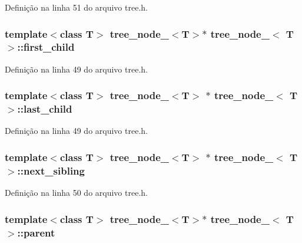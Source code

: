 Definição na linha 51 do arquivo tree.\+h.

\subsubsection[{first\+\_\+child}]{\setlength{\rightskip}{0pt plus 5cm}template$<$class T$>$ {\bf tree\+\_\+node\+\_\+}$<$T$>$$\ast$ {\bf tree\+\_\+node\+\_\+}$<$ T $>$\+::first\+\_\+child}\label{classtree__node___ad51591496e654515b662095f70d1fc1a}


Definição na linha 49 do arquivo tree.\+h.

\subsubsection[{last\+\_\+child}]{\setlength{\rightskip}{0pt plus 5cm}template$<$class T$>$ {\bf tree\+\_\+node\+\_\+}$<$T$>$ $\ast$ {\bf tree\+\_\+node\+\_\+}$<$ T $>$\+::last\+\_\+child}\label{classtree__node___a611d3c41c716dae6bf2012e3d9152933}


Definição na linha 49 do arquivo tree.\+h.

\subsubsection[{next\+\_\+sibling}]{\setlength{\rightskip}{0pt plus 5cm}template$<$class T$>$ {\bf tree\+\_\+node\+\_\+}$<$T$>$ $\ast$ {\bf tree\+\_\+node\+\_\+}$<$ T $>$\+::next\+\_\+sibling}\label{classtree__node___a195a647282d6ab1de50d9ac87aa42bce}


Definição na linha 50 do arquivo tree.\+h.

\subsubsection[{parent}]{\setlength{\rightskip}{0pt plus 5cm}template$<$class T$>$ {\bf tree\+\_\+node\+\_\+}$<$T$>$$\ast$ {\bf tree\+\_\+node\+\_\+}$<$ T $>$\+::parent}\label{classtree__node___a60597bf2f8288fdd616c52f8a5a4e477}


